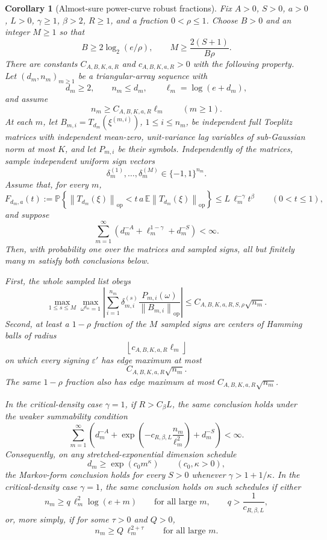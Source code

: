\documentclass[11pt]{amsart}
\numberwithin{equation}{section}
\newtheorem{corollary}[theorem]{Corollary}
\theoremstyle{definition}
\theoremstyle{remark}
\newcommand{\op}{\mathrm{op}}
\newcommand{\Prob}{\mathbb P}
\newcommand{\Exp}{\mathbb E}
\newcommand{\norm}[1]{\left\lVert #1\right\rVert}
\newcommand{\eps}{\varepsilon}
\begin{document}
\begin{corollary}[Almost-sure power-curve robust fractions]
\label{cor:normalizer-tail-power-borel-fractions}
Fix \(A>0\), \(S>0\), \(a>0\), \(L>0\), \(\gamma\ge1\), \(\beta>2\),
\(R\ge1\), and a fraction \(0<\rho\le1\).  Choose \(B>0\) and an integer
\(M\ge1\) so that
\[
  B\ge 2\log_2(e/\rho),
  \qquad
  M\ge \frac{2(S+1)}{B\rho}.
\]
There are constants \(C_{A,B,K,a,R}\) and \(c_{A,B,K,a,R}>0\) with the
following property.  Let \((d_m,n_m)_{m\ge1}\) be a triangular-array sequence
with
\[
  d_m\ge2,\qquad n_m\le d_m,\qquad \ell_m=\log(e+d_m),
\]
and assume
\[
  n_m\ge C_{A,B,K,a,R}\ell_m \qquad(m\ge1).
\]
At each \(m\), let \(B_{m,i}=T_{d_m}(\xi^{(m,i)})\), \(1\le i\le n_m\), be
independent full Toeplitz matrices with independent mean-zero, unit-variance lag
variables of sub-Gaussian norm at most \(K\), and let \(P_{m,i}\) be their
symbols.  Independently of the matrices, sample independent uniform sign vectors
\[
  \delta_m^{(1)},\ldots,\delta_m^{(M)}\in\{-1,1\}^{n_m}.
\]
Assume that, for every \(m\),
\[
  F_{d_m,a}(t):=
  \Prob\left\{\norm{T_{d_m}(\xi)}_{\op}
  <t\,a\,\Exp\norm{T_{d_m}(\xi)}_{\op}\right\}
  \le L\,\ell_m^{-\gamma}t^\beta
  \qquad(0<t\le1),
\]
and suppose
\[
  \sum_{m=1}^{\infty}\left(d_m^{-A}+\ell_m^{1-\gamma}+d_m^{-S}\right)<\infty .
\]
Then, with probability one over the matrices and sampled signs, all but
finitely many \(m\) satisfy both conclusions below.

First, the whole sampled list obeys
\[
  \max_{1\le s\le M}\max_{\omega^{d_m}=1}
  \left|\sum_{i=1}^{n_m}\delta_{m,i}^{(s)}
  \frac{P_{m,i}(\omega)}{\norm{B_{m,i}}_{\op}}\right|
  \le C_{A,B,K,a,R,S,\rho}\sqrt{n_m}.
\]
Second, at least a \(1-\rho\) fraction of the \(M\) sampled signs are centers of
Hamming balls of radius
\[
  \left\lfloor c_{A,B,K,a,R}\ell_m\right\rfloor
\]
on which every signing \(\eps'\) has edge maximum at most
\[
  C_{A,B,K,a,R}\sqrt{n_m}.
\]
The same \(1-\rho\) fraction also has edge maximum at most
\(C_{A,B,K,a,R}\sqrt{n_m}\).

In the critical-density case \(\gamma=1\), if \(R>C_\beta L\), the same
conclusion holds under the weaker summability condition
\[
  \sum_{m=1}^{\infty}
  \left(d_m^{-A}
  +\exp\left(-c_{R,\beta,L}\frac{n_m}{\ell_m^2}\right)
  +d_m^{-S}\right)<\infty .
\]
Consequently, on any stretched-exponential dimension schedule
\[
  d_m\ge\exp(c_0m^\kappa)
  \qquad(c_0,\kappa>0),
\]
the Markov-form conclusion holds for every \(S>0\) whenever
\(\gamma>1+1/\kappa\).  In the critical-density case \(\gamma=1\), the same
conclusion holds on such schedules if either
\[
  n_m\ge q\,\ell_m^2\log(e+m)
  \qquad\text{for all large }m,\qquad
  q>\frac1{c_{R,\beta,L}},
\]
or, more simply, if for some \(\tau>0\) and \(Q>0\),
\[
  n_m\ge Q\,\ell_m^{2+\tau}
  \qquad\text{for all large }m .
\]
\end{corollary}
\end{document}
